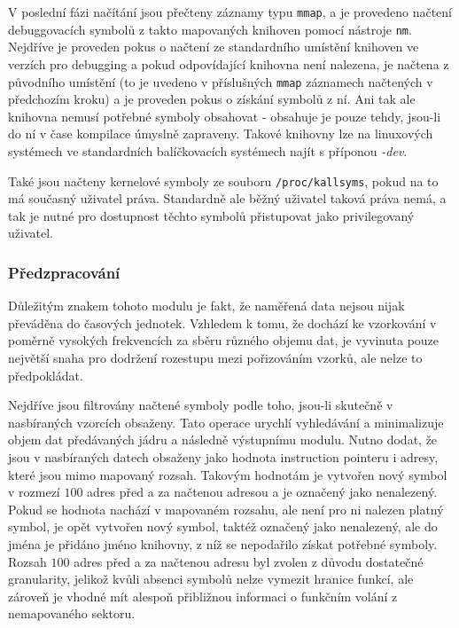 \documentclass[czech,BP]{thesiskiv}
\begin{document}
V poslední fázi načítání jsou přečteny záznamy typu \texttt{mmap}, a je provedeno načtení debuggovacích symbolů z takto mapovaných knihoven pomocí nástroje \texttt{nm}. Nejdříve je proveden pokus o načtení ze standardního umístění knihoven ve verzích pro debugging a pokud odpovídající knihovna není nalezena, je načtena z původního umístění (to je uvedeno v příslušných \texttt{mmap} záznamech načtených v předchozím kroku) a je proveden pokus o získání symbolů z ní. Ani tak ale knihovna nemusí potřebné symboly obsahovat - obsahuje je pouze tehdy, jsou-li do ní v čase kompilace úmyslně zapraveny. Takové knihovny lze na linuxových systémech ve standardních balíčkovacích systémech najít s příponou \emph{-dev}.

Také jsou načteny kernelové symboly ze souboru \texttt{/proc/kallsyms}, pokud na to má současný uživatel práva. Standardně ale běžný uživatel taková práva nemá, a tak je nutné pro dostupnost těchto symbolů přistupovat jako privilegovaný uživatel.

\subsubsection*{Předzpracování}

Důležitým znakem tohoto modulu je fakt, že naměřená data nejsou nijak převáděna do časových jednotek. Vzhledem k tomu, že dochází ke vzorkování v poměrně vysokých frekvencích za sběru různého objemu dat, je vyvinuta pouze největší snaha pro dodržení rozestupu mezi pořizováním vzorků, ale nelze to předpokládat.

Nejdříve jsou filtrovány načtené symboly podle toho, jsou-li skutečně v nasbíraných vzorcích obsaženy. Tato operace urychlí vyhledávání a minimalizuje objem dat předávaných jádru a následně výstupnímu modulu. Nutno dodat, že jsou v nasbíraných datech obsaženy jako hodnota instruction pointeru i adresy, které jsou mimo mapovaný rozsah. Takovým hodnotám je vytvořen nový  symbol v rozmezí $100$ adres před a za načtenou adresou a je označený jako nenalezený. Pokud se hodnota nachází v mapovaném rozsahu, ale není pro ni nalezen platný symbol, je opět vytvořen nový symbol, taktéž označený jako nenalezený, ale do jména je přidáno jméno knihovny, z níž se nepodařilo získat potřebné symboly. Rozsah $100$ adres před a za načtenou adresu byl zvolen z důvodu dostatečné granularity, jelikož kvůli absenci symbolů nelze vymezit hranice funkcí, ale zároveň je vhodné mít alespoň přibližnou informaci o funkčním volání z nemapovaného sektoru.
\end{document}

